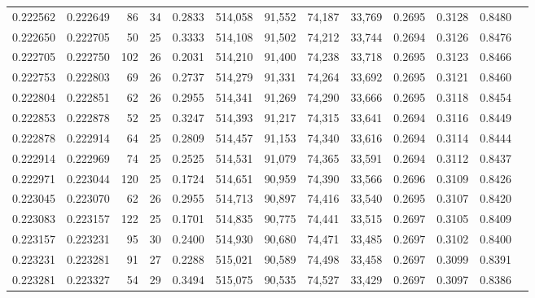 \begin{tabular}{rrrrrrrrrrrrr}
0.222562 & 0.222649 &  86 &  34 &                                     0.2833 & 514,058 &  91,552 &  74,187 &  33,769 & 0.2695 & 0.3128 & 0.8480 \\
0.222650 & 0.222705 &  50 &  25 &                                     0.3333 & 514,108 &  91,502 &  74,212 &  33,744 & 0.2694 & 0.3126 & 0.8476 \\
0.222705 & 0.222750 & 102 &  26 &                                     0.2031 & 514,210 &  91,400 &  74,238 &  33,718 & 0.2695 & 0.3123 & 0.8466 \\
0.222753 & 0.222803 &  69 &  26 &                                     0.2737 & 514,279 &  91,331 &  74,264 &  33,692 & 0.2695 & 0.3121 & 0.8460 \\
0.222804 & 0.222851 &  62 &  26 &                                     0.2955 & 514,341 &  91,269 &  74,290 &  33,666 & 0.2695 & 0.3118 & 0.8454 \\
0.222853 & 0.222878 &  52 &  25 &                                     0.3247 & 514,393 &  91,217 &  74,315 &  33,641 & 0.2694 & 0.3116 & 0.8449 \\
0.222878 & 0.222914 &  64 &  25 &                                     0.2809 & 514,457 &  91,153 &  74,340 &  33,616 & 0.2694 & 0.3114 & 0.8444 \\
0.222914 & 0.222969 &  74 &  25 &                                     0.2525 & 514,531 &  91,079 &  74,365 &  33,591 & 0.2694 & 0.3112 & 0.8437 \\
0.222971 & 0.223044 & 120 &  25 &                                     0.1724 & 514,651 &  90,959 &  74,390 &  33,566 & 0.2696 & 0.3109 & 0.8426 \\
0.223045 & 0.223070 &  62 &  26 &                                     0.2955 & 514,713 &  90,897 &  74,416 &  33,540 & 0.2695 & 0.3107 & 0.8420 \\
0.223083 & 0.223157 & 122 &  25 &                                     0.1701 & 514,835 &  90,775 &  74,441 &  33,515 & 0.2697 & 0.3105 & 0.8409 \\
0.223157 & 0.223231 &  95 &  30 &                                     0.2400 & 514,930 &  90,680 &  74,471 &  33,485 & 0.2697 & 0.3102 & 0.8400 \\
0.223231 & 0.223281 &  91 &  27 &                                     0.2288 & 515,021 &  90,589 &  74,498 &  33,458 & 0.2697 & 0.3099 & 0.8391 \\
0.223281 & 0.223327 &  54 &  29 &                                     0.3494 & 515,075 &  90,535 &  74,527 &  33,429 & 0.2697 & 0.3097 & 0.8386 \\

\end{tabular}
